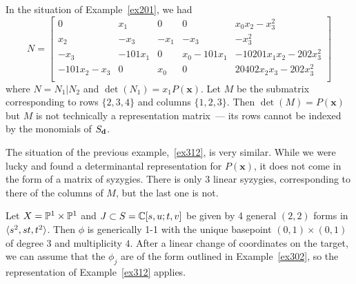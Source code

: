 \documentclass[fleqn,reqno]{amsart}
\begin{document}
\begin{example}[$\mt{ex313}$]
\label{ex313}
In the situation of Example~\ref{ex201}, we had
\[
	N=\begin{bmatrix}0&
	       {x}_{1}&
	       0&
	       0&
	       {x}_{0} {x}_{2}-{x}_{3}^{2}\\
	       {x}_{2}&
	       {-{x}_{3}}&
	       {-{x}_{1}}&
	       {-{x}_{3}}&
	       {-{x}_{3}^{2}}\\
	       {-{x}_{3}}&
	       {-101 {x}_{1}}&
	       0&
	       {x}_{0}-101 {x}_{1}&
	       -10201 {x}_{1} {x}_{2}-202 {x}_{3}^{2}\\
	       -101 {x}_{2}-{x}_{3}&
	       0&
	       {x}_{0}&
	       0&
	       20402 {x}_{2} {x}_{3}-202 {x}_{3}^{2}\\
	       \end{bmatrix}
\]
where $N=N_1|N_2$ and $\det(N_1)=x_1P(\mathbf x)$.
Let $M$ be the submatrix corresponding to rows $\{2,3,4\}$ and columns $\{1,2,3\}$.
Then $\det(M)=P(\mathbf x)$ but $M$ is not technically a representation matrix~---
its rows cannot be indexed by the monomials of $S_\mathbf d$.

The situation of the previous example,~\ref{ex312}, is very similar.
While we were lucky and found a determinantal representation for $P(\mathbf x)$,
it does not come in the form of a matrix of syzygies.
There is only $3$ linear syzygies, corresponding to there of the columns of $M$,
but the last one is not.
\end{example}


\begin{example}[$\mt{ex319}$]
\label{ex319}
Let $X=\mathbb{P}^1\times\mathbb{P}^1$ and $J\subset S=\mathbb{C}[s,u;t,v]$ be given by 4 general $(2,2)$ forms in $\langle s^2,st,t^2\rangle$.
Then $\phi$ is generically 1-1 with
the unique basepoint $(0,1)\times(0,1)$ of degree $3$ and multiplicity $4$.
After a linear change of coordinates on the target,
we can assume that the $\phi_j$ are of the form outlined in Example~\ref{ex302},
so the representation of Example~\ref{ex312} applies.
\end{example}
\end{document}
